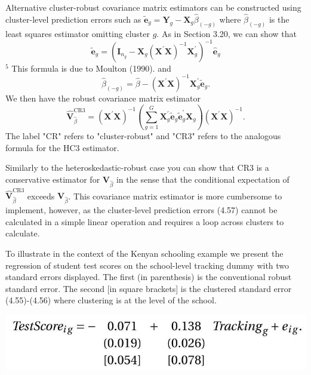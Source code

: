 \documentclass[10pt]{article}
\begin{document}
Alternative cluster-robust covariance matrix estimators can be constructed using cluster-level prediction errors such as $\widetilde{\boldsymbol{e}}_{g}=\boldsymbol{Y}_{g}-\boldsymbol{X}_{g} \widehat{\beta}_{(-g)}$ where $\widehat{\beta}_{(-g)}$ is the least squares estimator omitting cluster $g$. As in Section 3.20, we can show that
$$
\widetilde{\boldsymbol{e}}_{g}=\left(\boldsymbol{I}_{n_{g}}-\boldsymbol{X}_{g}\left(\boldsymbol{X}^{\prime} \boldsymbol{X}\right)^{-1} \boldsymbol{X}_{g}^{\prime}\right)^{-1} \widehat{\boldsymbol{e}}_{g}
$$
${ }^{5}$ This formula is due to Moulton (1990). and
$$
\widehat{\beta}_{(-g)}=\widehat{\beta}-\left(\boldsymbol{X}^{\prime} \boldsymbol{X}\right)^{-1} \boldsymbol{X}_{g}^{\prime} \widetilde{\boldsymbol{e}}_{g} .
$$
We then have the robust covariance matrix estimator
$$
\widehat{\boldsymbol{V}}_{\widehat{\beta}}^{\mathrm{CR} 3}=\left(\boldsymbol{X}^{\prime} \boldsymbol{X}\right)^{-1}\left(\sum_{g=1}^{G} \boldsymbol{X}_{g}^{\prime} \widetilde{\boldsymbol{e}}_{g} \widetilde{\boldsymbol{e}}_{g}^{\prime} \boldsymbol{X}_{g}\right)\left(\boldsymbol{X}^{\prime} \boldsymbol{X}\right)^{-1} .
$$
The label "CR" refers to "cluster-robust" and "CR3" refers to the analogous formula for the HC3 estimator.

Similarly to the heteroskedastic-robust case you can show that CR3 is a conservative estimator for $\boldsymbol{V}_{\widehat{\beta}}$ in the sense that the conditional expectation of $\widehat{\boldsymbol{V}}_{\widehat{\beta}}^{\mathrm{CR} 3}$ exceeds $\boldsymbol{V}_{\widehat{\beta}}$. This covariance matrix estimator is more cumbersome to implement, however, as the cluster-level prediction errors (4.57) cannot be calculated in a simple linear operation and requires a loop across clusters to calculate.

To illustrate in the context of the Kenyan schooling example we present the regression of student test scores on the school-level tracking dummy with two standard errors displayed. The first (in parenthesis) is the conventional robust standard error. The second [in square brackets] is the clustered standard error (4.55)-(4.56) where clustering is at the level of the school.

\includegraphics[max width=\textwidth]{2022_09_17_46fafb30295495354ae2g-31}
\end{document}
